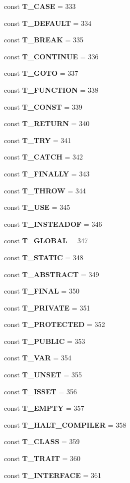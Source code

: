 \begin{DoxyCompactItemize}
const {\bf T\+\_\+\+C\+A\+S\+E} = 333
\item 
const {\bf T\+\_\+\+D\+E\+F\+A\+U\+L\+T} = 334
\item 
const {\bf T\+\_\+\+B\+R\+E\+A\+K} = 335
\item 
const {\bf T\+\_\+\+C\+O\+N\+T\+I\+N\+U\+E} = 336
\item 
const {\bf T\+\_\+\+G\+O\+T\+O} = 337
\item 
const {\bf T\+\_\+\+F\+U\+N\+C\+T\+I\+O\+N} = 338
\item 
const {\bf T\+\_\+\+C\+O\+N\+S\+T} = 339
\item 
const {\bf T\+\_\+\+R\+E\+T\+U\+R\+N} = 340
\item 
const {\bf T\+\_\+\+T\+R\+Y} = 341
\item 
const {\bf T\+\_\+\+C\+A\+T\+C\+H} = 342
\item 
const {\bf T\+\_\+\+F\+I\+N\+A\+L\+L\+Y} = 343
\item 
const {\bf T\+\_\+\+T\+H\+R\+O\+W} = 344
\item 
const {\bf T\+\_\+\+U\+S\+E} = 345
\item 
const {\bf T\+\_\+\+I\+N\+S\+T\+E\+A\+D\+O\+F} = 346
\item 
const {\bf T\+\_\+\+G\+L\+O\+B\+A\+L} = 347
\item 
const {\bf T\+\_\+\+S\+T\+A\+T\+I\+C} = 348
\item 
const {\bf T\+\_\+\+A\+B\+S\+T\+R\+A\+C\+T} = 349
\item 
const {\bf T\+\_\+\+F\+I\+N\+A\+L} = 350
\item 
const {\bf T\+\_\+\+P\+R\+I\+V\+A\+T\+E} = 351
\item 
const {\bf T\+\_\+\+P\+R\+O\+T\+E\+C\+T\+E\+D} = 352
\item 
const {\bf T\+\_\+\+P\+U\+B\+L\+I\+C} = 353
\item 
const {\bf T\+\_\+\+V\+A\+R} = 354
\item 
const {\bf T\+\_\+\+U\+N\+S\+E\+T} = 355
\item 
const {\bf T\+\_\+\+I\+S\+S\+E\+T} = 356
\item 
const {\bf T\+\_\+\+E\+M\+P\+T\+Y} = 357
\item 
const {\bf T\+\_\+\+H\+A\+L\+T\+\_\+\+C\+O\+M\+P\+I\+L\+E\+R} = 358
\item 
const {\bf T\+\_\+\+C\+L\+A\+S\+S} = 359
\item 
const {\bf T\+\_\+\+T\+R\+A\+I\+T} = 360
\item 
const {\bf T\+\_\+\+I\+N\+T\+E\+R\+F\+A\+C\+E} = 361

\end{DoxyCompactItemize}
